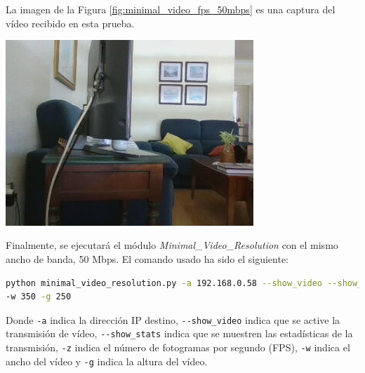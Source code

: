 \newpage

La imagen de la Figura \ref{fig:minimal_video_fps_50mbps} es una captura del vídeo recibido en esta prueba.
\begin{center}
  \includegraphics[width = 0.7\textwidth]{images/VideoRecibido3.2.png}
  \label{fig:minimal_video_fps_50mbps}
\end{center}

\newpage
Finalmente, se ejecutará el módulo \textit{Minimal\_Video\_Resolution} con el mismo ancho de banda, 50 Mbps. El comando usado ha sido el siguiente:

\begin{lstlisting}[language=bash,basicstyle=\ttfamily\scriptsize]
python minimal_video_resolution.py -a 192.168.0.58 --show_video --show_stats -z 12 \\
-w 350 -g 250
\end{lstlisting}
Donde \verb|-a| indica la dirección IP destino, \verb|--show_video| indica que se active la transmisión de vídeo, \verb|--show_stats| indica que se muestren las estadísticas de la transmisión, \verb|-z| indica el número de fotogramas por segundo (FPS), \verb|-w| indica el ancho del vídeo y \verb|-g| indica la altura del vídeo.
\vspace{\baselineskip}

